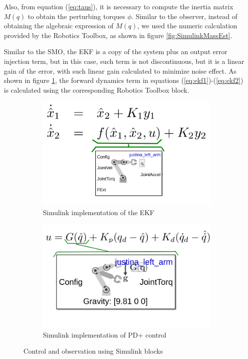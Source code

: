 \documentclass[a4paper, 10pt]{article}
\begin{document}
Also, from equation (\ref{eq:taus}), it is necessary to compute the inertia matrix $M(q)$ to obtain the perturbing torques $\phi$. Similar to the observer, instead of obtaining the algebraic expression of $M(q)$, we used the numeric calculation provided by the Robotics Toolbox, as shown in figure \ref{fig:SimulinkMassEst}.

  Similar to the SMO, the EKF is a copy of the system plus an output error injection term, but in this case, such term is not discontinuous, but it is a linear gain of the error, with such linear gain calculated to minimize noise effect. As shown in figure \ref{fig:EKFSimulink}, the forward dynamics term in equations (\ref{eq:ekf1})-(\ref{eq:ekf2}) is calculated using the corresponding Robotics Toolbox block. 

\begin{figure}
  \centering    
  \begin{subfigure}{0.35\textwidth}
  \centering
  \includegraphics[width=\textwidth]{Figures/EKFSimulink.png}
  \caption{Simulink implementation of the EKF}
  \label{fig:EKFSimulink}
  \end{subfigure}
  \begin{subfigure}{0.35\textwidth}
  \centering
  \includegraphics[width=\textwidth]{Figures/ControlSimulink.png}
  \caption{Simulink implementation of PD+ control}
  \label{fig:ControlSimulink}
  \end{subfigure}
  \caption{Control and observation using Simulink blocks}
\end{figure}
\end{document}
